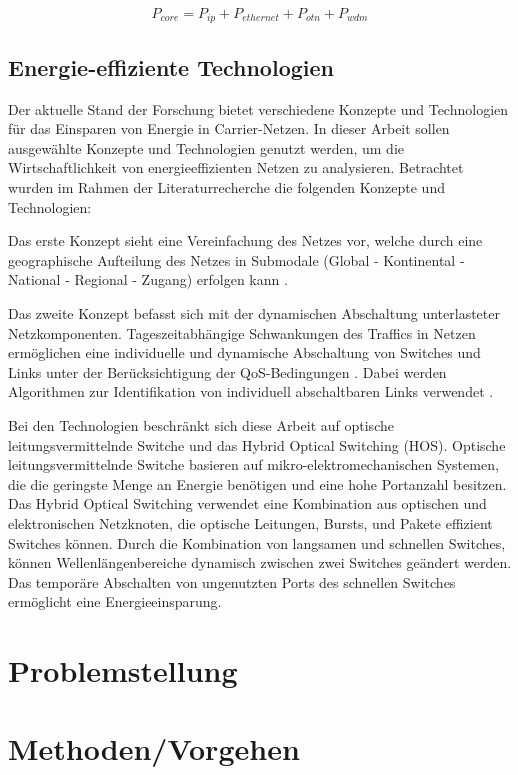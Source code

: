 \documentclass[12pt,titlepage]{article}
\begin{document}
\begin{equation}
P_{core} = P_{ip} + P_{ethernet} + P_{otn} + P_{wdm}
\end{equation}


\subsection{Energie-effiziente Technologien}
Der aktuelle Stand der Forschung bietet verschiedene Konzepte und Technologien für das Einsparen von Energie in Carrier-Netzen. In dieser Arbeit sollen ausgewählte Konzepte und Technologien genutzt werden, um die Wirtschaftlichkeit von energieeffizienten Netzen zu analysieren. Betrachtet wurden im Rahmen der Literaturrecherche die folgenden Konzepte und Technologien: 

Das erste Konzept sieht eine Vereinfachung des Netzes vor, welche durch eine geographische Aufteilung des Netzes in Submodale (Global - Kontinental - National - Regional - Zugang) erfolgen kann \cite{aleksic2014}.

Das zweite Konzept befasst sich mit der dynamischen Abschaltung unterlasteter Netzkomponenten. Tageszeitabhängige Schwankungen des Traffics in Netzen ermöglichen eine individuelle und dynamische Abschaltung von Switches und Links unter der Be\-rück\-sich\-ti\-gung der QoS-Bedingungen \cite{aleksic2013}. Dabei werden Algorithmen zur Identifikation von individuell abschaltbaren Links verwendet \cite{fisher}.

Bei den Technologien beschränkt sich diese Arbeit auf optische leitungsvermittelnde Switche und das Hybrid Optical Switching (HOS). Optische leitungsvermittelnde Switche basieren auf mikro-elektromechanischen Systemen, die die geringste Menge an Energie benötigen und eine hohe Portanzahl besitzen. Das Hybrid Optical Switching verwendet eine Kombination aus optischen und elektronischen Netzknoten, die optische Leitungen, Bursts, und Pakete effizient Switches können. Durch die Kombination von langsamen und schnellen Switches, können Wellenlängenbereiche dynamisch zwischen zwei Switches geändert werden. Das temporäre Abschalten von ungenutzten Ports des schnellen Switches ermöglicht eine Energieeinsparung.  \cite{aleksic2013}

\section{Problemstellung}

\section{Methoden/Vorgehen}
\end{document}
